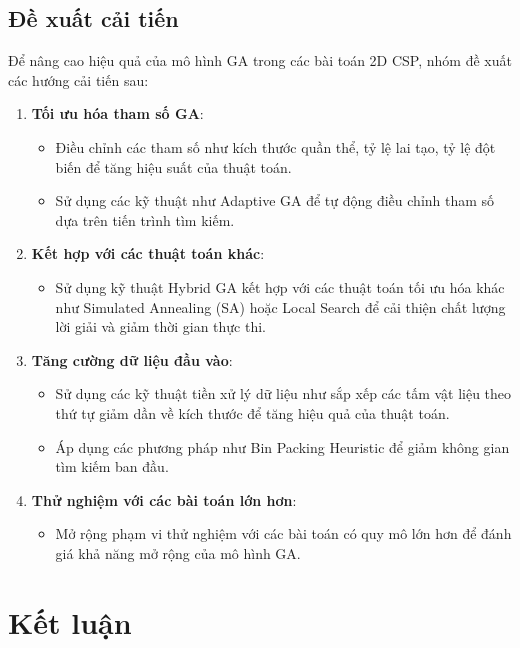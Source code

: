 \documentclass[a4paper]{article}
\begin{document}
\subsection{Đề xuất cải tiến}

Để nâng cao hiệu quả của mô hình GA trong các bài toán 2D CSP, nhóm đề xuất các hướng cải tiến sau:

\begin{enumerate}
    \item \textbf{Tối ưu hóa tham số GA}:
    \begin{itemize}
        \item Điều chỉnh các tham số như kích thước quần thể, tỷ lệ lai tạo, tỷ lệ đột biến để tăng hiệu suất của thuật toán.
        \item Sử dụng các kỹ thuật như Adaptive GA để tự động điều chỉnh tham số dựa trên tiến trình tìm kiếm.
    \end{itemize}
    
    \item \textbf{Kết hợp với các thuật toán khác}:
    \begin{itemize}
        \item Sử dụng kỹ thuật Hybrid GA kết hợp với các thuật toán tối ưu hóa khác như Simulated Annealing (SA) hoặc Local Search để cải thiện chất lượng lời giải và giảm thời gian thực thi.
    \end{itemize}
    
    \item \textbf{Tăng cường dữ liệu đầu vào}:
    \begin{itemize}
        \item Sử dụng các kỹ thuật tiền xử lý dữ liệu như sắp xếp các tấm vật liệu theo thứ tự giảm dần về kích thước để tăng hiệu quả của thuật toán.
        \item Áp dụng các phương pháp như Bin Packing Heuristic để giảm không gian tìm kiếm ban đầu.
    \end{itemize}
    
    \item \textbf{Thử nghiệm với các bài toán lớn hơn}:
    \begin{itemize}
        \item Mở rộng phạm vi thử nghiệm với các bài toán có quy mô lớn hơn để đánh giá khả năng mở rộng của mô hình GA.
    \end{itemize}
\end{enumerate}


\section{Kết luận}
\end{document}
